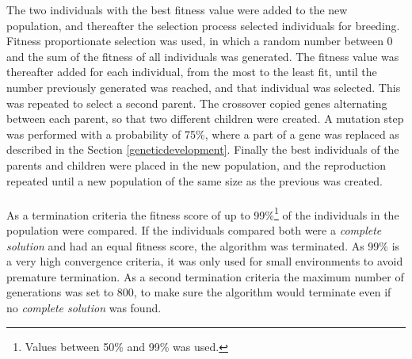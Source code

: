 The two individuals with the best fitness value were added to the new population, and thereafter the selection process selected individuals for breeding. Fitness proportionate selection was used, in which a random number between 0 and the sum of the fitness of all individuals was generated. The fitness value was thereafter added for each individual, from the most to the least fit, until the number previously generated was reached, and that individual was selected. This was repeated to select a second parent. The crossover copied genes alternating between each parent, so that two different children were created. A mutation step was performed with a probability of 75\%, where a part of a gene was replaced as described in the Section \ref{geneticdevelopment}. Finally the best individuals of the parents and children were  placed in the new population, and the reproduction repeated until a new population of the same size as the previous was created.\\\\
As a termination criteria the fitness score of up to 99\%\footnote{Values between 50\% and 99\% was used.} of the individuals in the population were compared. If the individuals compared both were a \emph{complete solution} and had an equal fitness score, the algorithm was terminated. As 99\% is a very high convergence criteria, it was only used for small environments to avoid premature termination. As a second termination criteria the maximum number of generations was set to 800, to make sure the algorithm would terminate even if no \emph{complete solution} was found.

